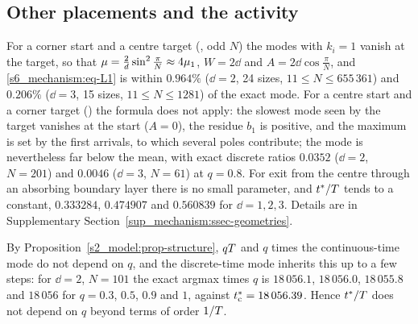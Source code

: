 \subsection{Other placements and the activity}\label{s6_mechanism:ssec-geometries}

For a corner start and a centre target (\CtM, odd $N$) the modes with $k_i=1$ vanish at the target, so that
$\mu=\tfrac{2}{d}\sin^{2}\tfrac{\pi}{N}\approx4\mu_{1}$, $W=2\dd$ and $A=2\dd\cos\tfrac{\pi}{N}$, and
\eqref{s6_mechanism:eq-L1} is within $0.964\%$ ($\dd=2$, 24 sizes, $11\le N\le655\,361$) and $0.206\%$ ($\dd=3$, 15
sizes, $11\le N\le1281$) of the exact mode. For a centre start and a corner target (\MtC) the formula does not apply:
the slowest mode seen by the target vanishes at the start ($A=0$), the residue $b_1$ is positive, and the maximum is set
by the first arrivals, to which several poles contribute; the mode is nevertheless far below the mean, with exact
discrete ratios $0.0352$ ($\dd=2$, $N=201$) and $0.0046$ ($\dd=3$, $N=61$) at $q=0.8$. For exit from the centre through an
absorbing boundary layer there is no small parameter, and $t^{*}/T$ tends to a constant, $0.333284$, $0.474907$ and
$0.560839$ for $\dd=1,2,3$. Details are in Supplementary Section~\ref{sup_mechanism:ssec-geometries}.

By Proposition~\ref{s2_model:prop-structure}, $qT$ and $q$ times the continuous-time mode do not depend on $q$, and the
discrete-time mode inherits this up to a few steps: for $\dd=2$, $N=101$ the exact argmax times $q$ is $18\,056.1$,
$18\,056.0$, $18\,055.8$ and $18\,056$ for $q=0.3$, $0.5$, $0.9$ and $1$, against $t^{*}_{\mathrm{c}}=18\,056.39$. Hence
$t^{*}/T$ does not depend on $q$ beyond terms of order $1/T$.
